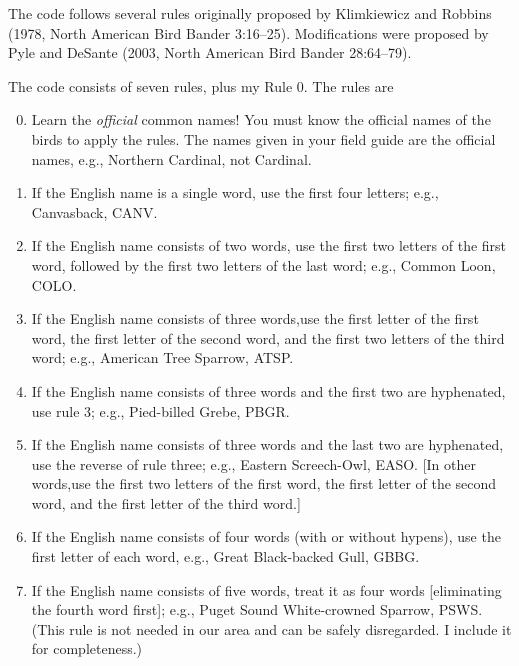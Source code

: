 \documentclass[11pt]{article}
\begin{document}
The code follows several rules originally proposed by Klimkiewicz and Robbins (1978, North American Bird Bander 3:16–25). Modifications were proposed by Pyle and DeSante (2003, North American Bird Bander 28:64–79).

The code consists of seven rules, plus my Rule 0.  The rules are

\begin{enumerate}
\setcounter{enumi}{-1}
\item Learn the \emph{official} common names! You must know the official names of the birds to apply the rules. The names given in your field guide are the official names, e.g., Northern Cardinal, not Cardinal.

\item If the English name is a single word, use the
first four letters; e.g., Canvasback, CANV.

\item If the English name consists of two words, use
the first two letters of the first word, followed by
the first two letters of the last word; e.g.,
Common Loon, COLO.

\item If the English name consists of three words,use the first letter of the first word, the first letter of the second word, and the first two letters of the third word; e.g., American Tree Sparrow, ATSP.

\item If the English name consists of three words and
the first two are hyphenated, use rule 3; e.g.,
Pied-billed Grebe, PBGR.

\item If the English name consists of three words and the last two are hyphenated, use the reverse of rule three; e.g., Eastern Screech-Owl, EASO. [In other words,use the first two letters of the first word, the first letter of the second word, and the first letter of the third word.]

\item If the English name consists of four words
(with or without hypens), use the first letter of
each word, e.g., Great Black-backed Gull,
GBBG.

\item If the English name consists of five words, treat
it as four words [eliminating the fourth word first]; e.g., Puget Sound White-crowned Sparrow, PSWS. (This rule is not needed in our area and can be safely disregarded. I include it for completeness.)

\end{enumerate}
\end{document}

